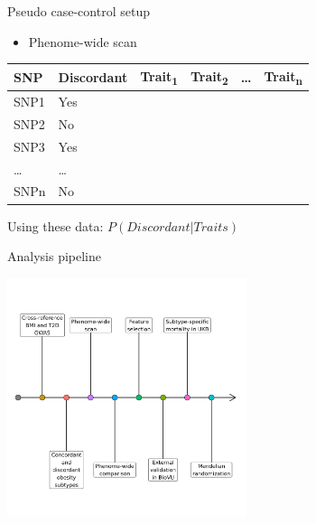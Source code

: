 \documentclass[presentation]{beamer}
\begin{document}
\begin{frame}[label={sec:orgce9b375}]{Pseudo case-control setup}
\begin{itemize}
\item Phenome-wide scan
\end{itemize}

\begin{center}
\begin{tabular}{llllll}
SNP & \alert{Discordant} & Trait\textsubscript{1} & Trait\textsubscript{2} & \ldots{} & Trait\textsubscript{n}\\
\hline
SNP1 & Yes &  &  &  & \\
SNP2 & No &  &  &  & \\
SNP3 & Yes &  &  &  & \\
\ldots{} & \ldots{} &  &  &  & \\
SNPn & No &  &  &  & \\
\end{tabular}
\end{center}

\begin{center}
Using these data:
\(P(Discordant|Traits)\)
\end{center}
\end{frame}

\begin{frame}[label={sec:org1d25736}]{Analysis pipeline}
\begin{center}
\includegraphics[width=7cm]{./plots/aline_plot.png}
\end{center}
\end{frame}
\end{document}
